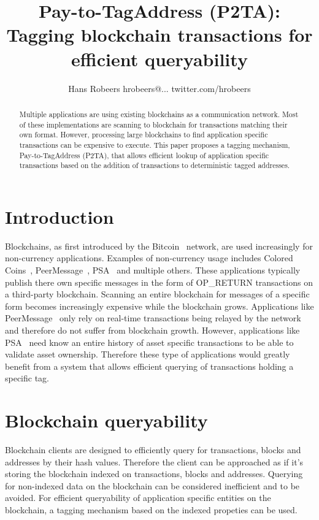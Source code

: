\documentclass[a4paper,10pt]{article}
\title{Pay-to-TagAddress (P2TA): Tagging blockchain transactions for efficient queryability}
\author{Hans Robeers hrobeers@... twitter.com/hrobeers}
\begin{document}
\maketitle

\begin{abstract}
Multiple applications are using existing blockchains as a communication network.
Most of these implementations are scanning to blockchain for transactions matching their own format.
However, processing large blockchains to find application specific transactions can be expensive to execute.
This paper proposes a tagging mechanism, Pay-to-TagAddress (P2TA), that allows efficient lookup of application specific transactions based on the addition of transactions to deterministic tagged addresses.
\end{abstract}

\section{Introduction}
Blockchains, as first introduced by the Bitcoin~\cite{Nak09} network, are used increasingly for non-currency applications.
Examples of non-currency usage includes Colored Coins~\cite{Ros12}, PeerMessage~\cite{Emeth}, PSA~\cite{Pchem} and multiple others.
These applications typically publish there own specific messages in the form of OP\_RETURN transactions on a third-party blockchain.
Scanning an entire blockchain for messages of a specific form becomes increasingly expensive while the blockchain grows.
Applications like PeerMessage~\cite{Emeth} only rely on real-time transactions being relayed by the network and therefore do not suffer from blockchain growth.
However, applications like PSA~\cite{Pchem} need know an entire history of asset specific transactions to be able to validate asset ownership.
Therefore these type of applications would greatly benefit from a system that allows efficient querying of transactions holding a specific tag.

\section{Blockchain queryability}
Blockchain clients are designed to efficiently query for transactions, blocks and addresses by their hash values.
Therefore the client can be approached as if it's storing the blockchain indexed on transactions, blocks and addresses.
Querying for non-indexed data on the blockchain can be considered inefficient and to be avoided.
For efficient queryability of application specific entities on the blockchain, a tagging mechanism based on the indexed propeties can be used.
\end{document}
